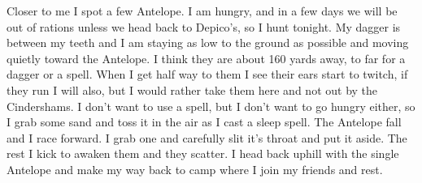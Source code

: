 \documentclass[11pt]{article}
\begin{document}
\newpage

Closer to me I spot a few Antelope. I am hungry, and in a few days we will be out of rations unless we head back to Depico’s, so I hunt tonight. My dagger is between my teeth and I am staying as low to the ground as possible and moving quietly toward the Antelope. I think they are about 160 yards away, to far for a dagger or a spell. When I get half way to them I see their ears start to twitch, if they run I will also, but I would rather take them here and not out by the Cindershams. I don’t want to use a spell, but I don’t want to go hungry either, so I grab some sand and toss it in the air as I cast a sleep spell. The Antelope fall and I race forward. I grab one and carefully slit it’s throat and put it aside. The rest I kick to awaken them and they scatter. I head back uphill with the single Antelope and make my way back to camp where I join my friends and rest.
\end{document}
